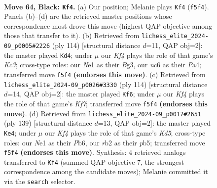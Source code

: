 \documentclass[11pt]{article}
\begin{document}
\clearpage

\begin{figure}[p]\centering
\begin{subfigure}{0.46\textwidth}\centering
\resizebox{\linewidth}{!}{%
\newchessgame
\chessboard[
  setfen={8/8/2Np4/5k2/7p/6p1/1R6/4n1K1 b - - 3 64},
  showmover=false,
  pgfstyle=straightmove, color=movearrow, markmove={f5-f4}
]}
\caption{}
\end{subfigure}\hfill
\begin{subfigure}{0.46\textwidth}\centering
\resizebox{\linewidth}{!}{%
\newchessgame
\chessboard[
  setfen={8/3k4/p7/3P4/P3P3/2K3B1/8/8 w - - 1 58},
  showmover=false,
  pgfstyle=straightmove, color=movearrow, markmove={c3-d4}
]}
\caption{}
\end{subfigure}
\\[4pt]
\begin{subfigure}{0.46\textwidth}\centering
\resizebox{\linewidth}{!}{%
\newchessgame
\chessboard[
  setfen={7k/5K2/7P/6P1/8/8/1p6/1N6 w - - 1 58},
  showmover=false,
  pgfstyle=straightmove, color=movearrow, markmove={f7-f6}
]}
\caption{}
\end{subfigure}\hfill
\begin{subfigure}{0.46\textwidth}\centering
\resizebox{\linewidth}{!}{%
\newchessgame
\chessboard[
  setfen={8/8/1p6/1P4p1/3k1pP1/8/5K2/8 b - - 1 70},
  showmover=false,
  pgfstyle=straightmove, color=movearrow, markmove={d4-e4}
]}
\caption{}
\end{subfigure}
\caption{\textbf{Move 64, Black: \texttt{Kf4}.} (a) Our position; Melanie plays \texttt{Kf4} (\texttt{f5f4}). Panels (b)--(d) are the retrieved master positions whose correspondence most drove this move (highest QAP objective among those that transfer to it). (b) Retrieved from \texttt{lichess\_elite\_2024-09\_p0005\#2226} (ply 114) [structural distance $d$=11, QAP obj=2]: the master played \texttt{Kd4}; under $\mu$ our \emph{Kf4} plays the role of that game's \emph{Kc3}; cross-type roles: our \emph{N}e1 as their \emph{B}g3, our \emph{n}c6 as their \emph{P}a4; transferred move \texttt{f5f4} \textbf{(endorses this move)}. (c) Retrieved from \texttt{lichess\_elite\_2024-09\_p0026\#3330} (ply 114) [structural distance $d$=14, QAP obj=2]: the master played \texttt{Kf6}; under $\mu$ our \emph{Kf4} plays the role of that game's \emph{Kf7}; transferred move \texttt{f5f4} \textbf{(endorses this move)}. (d) Retrieved from \texttt{lichess\_elite\_2024-09\_p0017\#2651} (ply 139) [structural distance $d$=13, QAP obj=2]: the master played \texttt{Ke4}; under $\mu$ our \emph{Kf4} plays the role of that game's \emph{Kd5}; cross-type roles: our \emph{N}e1 as their \emph{P}b6, our \emph{r}b2 as their \emph{p}b5; transferred move \texttt{f5f4} \textbf{(endorses this move)}. Synthesis: 4 retrieved analogs transferred to \texttt{Kf4} (summed QAP objective 7, the strongest correspondence among the candidate moves); Melanie committed it via the \texttt{search} selector.}
\label{fig:thought-m127}
\end{figure}
\end{document}
